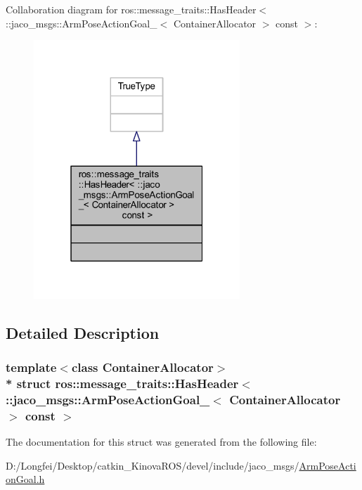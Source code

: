 Collaboration diagram for ros\+:\+:message\+\_\+traits\+:\+:Has\+Header$<$ \+:\+:jaco\+\_\+msgs\+:\+:Arm\+Pose\+Action\+Goal\+\_\+$<$ Container\+Allocator $>$ const $>$\+:
\nopagebreak
\begin{figure}[H]
\begin{center}
\leavevmode
\includegraphics[width=220pt]{dc/df6/structros_1_1message__traits_1_1HasHeader_3_01_1_1jaco__msgs_1_1ArmPoseActionGoal___3_01Containe69d607ffcbf755f385f1d3d4d4f3477d}
\end{center}
\end{figure}


\subsection{Detailed Description}
\subsubsection*{template$<$class Container\+Allocator$>$\\*
struct ros\+::message\+\_\+traits\+::\+Has\+Header$<$ \+::jaco\+\_\+msgs\+::\+Arm\+Pose\+Action\+Goal\+\_\+$<$ Container\+Allocator $>$ const  $>$}



The documentation for this struct was generated from the following file\+:\begin{DoxyCompactItemize}
\item 
D\+:/\+Longfei/\+Desktop/catkin\+\_\+\+Kinova\+R\+O\+S/devel/include/jaco\+\_\+msgs/\hyperlink{ArmPoseActionGoal_8h}{Arm\+Pose\+Action\+Goal.\+h}\end{DoxyCompactItemize}
